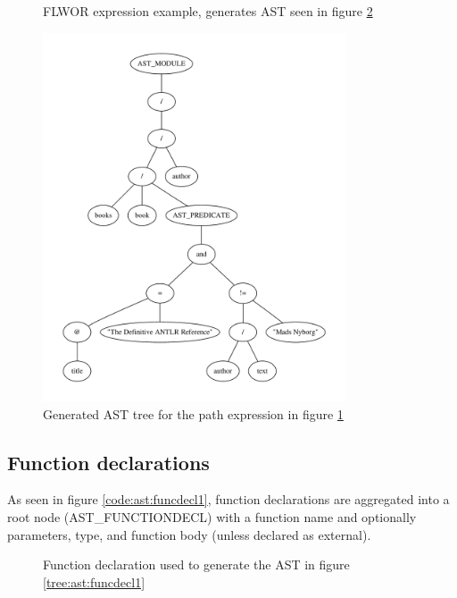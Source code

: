 \begin{figure}[h]

\caption{FLWOR expression example, generates AST seen in figure \ref{tree:ast:pathexpr}}
\label{code:xq:pathexpr}
\end{figure}

\begin{figure}[h]
\centering
 \includegraphics[width=0.8\textwidth]{img/graphs/pathexpr}
\caption{Generated AST tree for the path expression in figure 
\ref{code:xq:pathexpr}}
\label{tree:ast:pathexpr}
\end{figure}

\subsection{Function declarations}

As seen in figure \ref{code:ast:funcdecl1}, function declarations are aggregated
into a root node (AST\_FUNCTIONDECL) with a function name and optionally
parameters, type, and function body (unless declared as external).

\begin{figure}[h]

\caption{Function declaration used to generate the AST in figure
\ref{tree:ast:funcdecl1}}
\label{code:xq:funcdecl1}
\end{figure}

